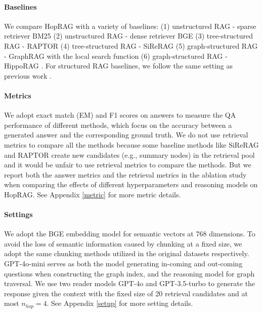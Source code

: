 \paragraph{Baselines}
We compare HopRAG with a variety of baselines: (1) unstructured RAG - sparse retriever BM25 \citep{robertson_probabilistic_2009} 
 (2) unstructured RAG - dense retriever BGE \citep{BGE,karpukhin2020densepassageretrievalopendomain} (3) tree-structured RAG - RAPTOR \citep{sarthi_raptor_2024} (4) tree-structured RAG - SiReRAG \citep{zhang2024sireragindexingsimilarrelated} (5) graph-structured RAG - GraphRAG \citep{edge_local_2024} with the local search function (6) graph-structured RAG - HippoRAG \citep{gutiérrez2025hipporagneurobiologicallyinspiredlongterm}. For structured RAG baselines, we follow the same setting as previous work \citep{zhang2024sireragindexingsimilarrelated}. 

\paragraph{Metrics}
We adopt exact match (EM) and F1 scores on answers to measure the QA performance of different methods, which focus on the accuracy between a generated answer and the corresponding ground truth. We do not use retrieval metrics to compare all the methods because some baseline methods like SiReRAG \citep{zhang2024sireragindexingsimilarrelated} and RAPTOR \citep{sarthi_raptor_2024} create new candidates (e.g., summary nodes) in the retrieval pool and it would be unfair to use retrieval metrics to compare the methods. But we report both the answer metrics and the retrieval metrics in the ablation study when comparing the effects of different hyperparameters and reasoning models on HopRAG. See Appendix \ref{metric} for more metric details.
\paragraph{Settings}
We adopt the BGE embedding model for semantic vectors at 768 dimensions. To avoid the loss of semantic information caused by chunking at a fixed size, we adopt the same chunking methods utilized in the original datasets respectively. 
GPT-4o-mini serves as both the model generating in-coming and out-coming questions when constructing the graph index, and the reasoning model for graph traversal. We use two reader models GPT-4o and GPT-3.5-turbo to generate the response given the context with the fixed size of 20 retrieval candidates and at most $n_{hop}=4$. See Appendix \ref{setup} for more setting details. 
